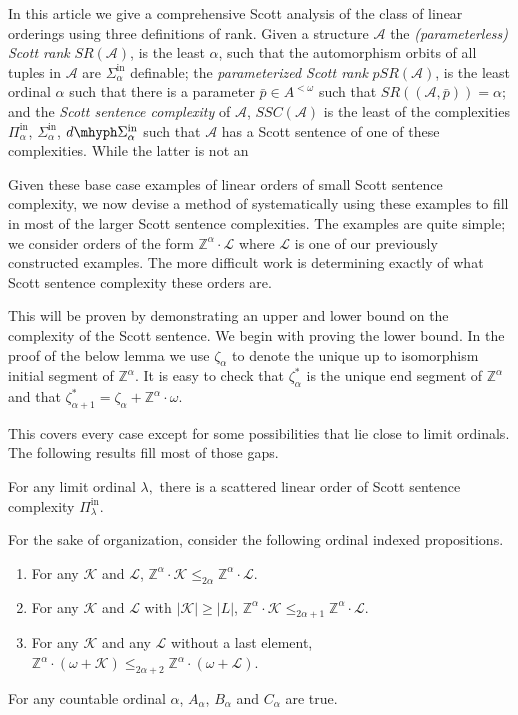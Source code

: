 \documentclass[10pt,a4paper]{amsart}
\providecommand{\tightlist}{%
  \setlength{\itemsep}{0pt}\setlength{\parskip}{0pt}}
\providecommand{\A}{\mathcal{A}}
\providecommand{\L}{\mathcal{L}}
\providecommand{\Pinf}[1]{\Pi^{\mathrm{in}}_{#1}}
\providecommand{\Sinf}[1]{\Sigma^{\mathrm{in}}_{#1}}
\providecommand{\dSinf}[1]{d\mhyph\Sigma^{\mathrm{in}}_{#1}}
\providecommand{\bp}{\bar p}
\newcommand{\SR}{SR}
\newcommand{\pSR}{pSR}
\newcommand{\Z}{\mathbb{Z}}
\newcommand{\K}{\mathcal{K}}
\renewcommand{\L}{\mathcal{L}}
\begin{document}
In this article we give a comprehensive Scott analysis of the class of linear
orderings using three definitions of rank. Given a structure $\A$ the
\emph{(parameterless) Scott rank} $\SR(\A)$, is the least $\alpha$, such that
the automorphism orbits of all tuples in $\A$ are $\Sinf{\alpha}$ definable; the
\emph{parameterized Scott rank} $\pSR(\A)$, is the least ordinal $\alpha$ such
that there is a parameter $\bp\in A^{<\omega}$ such that $SR((\A,\bp))=\alpha$;
and the \emph{Scott sentence complexity} of $\A$, $SSC(\A)$ is the least of the
complexities $\Pinf{\alpha}$, $\Sinf{\alpha}$, $\dSinf{\alpha}$ such that $\A$
has a Scott sentence of one of these complexities. While the latter is not an

Given these base case examples of linear orders of small Scott sentence complexity, we now devise a method of systematically using these examples to fill in most of the larger Scott sentence complexities. 
The examples are quite simple; we consider orders of the form $\Z^\alpha\cdot
\L$ where $\L$ is one of our previously constructed examples. 
The more difficult work is determining exactly of what Scott sentence complexity these orders are. 
 
This will be proven by demonstrating an upper and lower bound on the complexity of the Scott sentence. 
We begin with proving the lower bound. 
In the proof of the below lemma we use $\zeta_\alpha$ to denote the unique up to
isomorphism initial segment of $\Z^\alpha$. 
It is easy to check that $\zeta_\alpha^*$ is the unique end segment of  $\Z^\alpha$ and that $\zeta_{\alpha+1}^*=\zeta_\alpha+\Z^\alpha\cdot\omega$. 

This covers every case except for some possibilities that lie close to limit
ordinals. The following results fill most of those gaps.

\begin{proposition}\label{prop:scatteredlimit}
For any limit ordinal $\lambda,$ there is a scattered linear order of Scott sentence complexity $\Pinf{\lambda}.$
\end{proposition}

\begin{lemma}\label{lem:timesZ}
For the sake of organization, consider the following ordinal indexed propositions.
\begin{enumerate}\tightlist
\item[($A_\alpha$)] For any $\K$ and $\L$, $\Z^\alpha\cdot \K
    \leq_{2\alpha}\Z^\alpha\cdot \L$.
\item[($B_\alpha$)] For any $\K$ and $\L$ with $|\K|\geq|L|$, $\Z^\alpha\cdot \K
    \leq_{2\alpha+1}\Z^\alpha\cdot \L$.
\item[($C_\alpha$)] For any $\K$ and any $\L$ without a last element,
    $\Z^\alpha\cdot(\omega+\K)\leq_{2\alpha+2} \Z^\alpha\cdot(\omega+\L)$.
\end{enumerate}
For any countable ordinal $\alpha$, $A_\alpha$, $B_\alpha$ and $C_\alpha$ are true.
\end{lemma}
\end{document}
